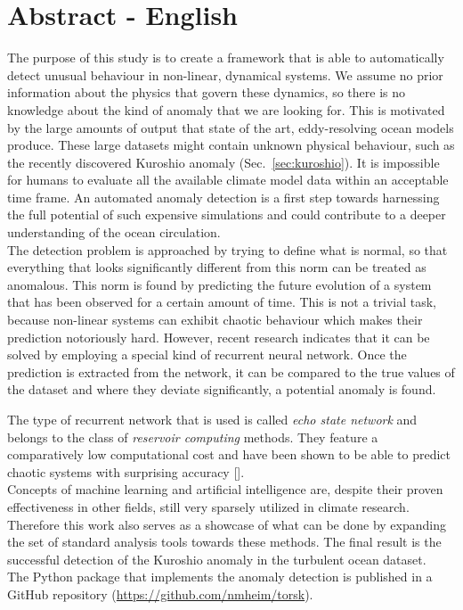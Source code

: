 \section*{Abstract - English}%
\label{sec:abstract}

The purpose of this study is to create a framework that is able to
automatically detect unusual behaviour in non-linear, dynamical systems.  We
assume no prior information about the physics that govern these dynamics, so
there is no knowledge about the kind of anomaly that we are looking for.  This
is motivated by the large amounts of output that state of the art,
eddy-resolving ocean models produce.  These large datasets might contain
unknown physical behaviour, such as the recently discovered Kuroshio anomaly
(Sec.~\ref{sec:kuroshio}).  It is impossible for humans to evaluate all the
available climate model data within an acceptable time frame. An automated
anomaly detection is a first step towards harnessing the full potential of such
expensive simulations and could contribute to a deeper understanding of the
ocean circulation.\\

The detection problem is approached by trying to define what is normal, so that
everything that looks significantly different from this norm can be treated as
anomalous. This norm is found by predicting the future evolution of a system
that has been observed for a certain amount of time.  This is not a trivial
task, because non-linear systems can exhibit chaotic behaviour which makes
their prediction notoriously hard. However, recent research indicates that it
can be solved by employing a special kind of recurrent neural network. Once the
prediction is extracted from the network, it can be compared to the true values
of the dataset and where they deviate significantly, a potential anomaly is
found.

The type of recurrent network that is used is called \emph{echo state network}
and belongs to the class of \emph{reservoir computing} methods.  They feature a
comparatively low computational cost and have been shown to be able to predict
chaotic systems with surprising accuracy [\cite{pathak2018model}].\\

Concepts of machine learning and artificial intelligence are, despite their
proven effectiveness in other fields, still very sparsely utilized in climate
research.  Therefore this work also serves as a showcase of what can be done by
expanding the set of standard analysis tools towards these methods.  The final
result is the successful detection of the Kuroshio anomaly in the turbulent
ocean dataset.\\

The Python package that implements the anomaly detection is published in a GitHub
repository (\url{https://github.com/nmheim/torsk}).
